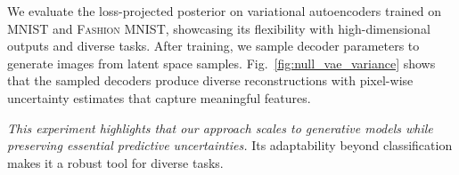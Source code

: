We evaluate the loss-projected posterior on variational autoencoders \citep{kingma2013auto} trained on \textsc{MNIST} and \textsc{Fashion MNIST}, showcasing its flexibility with high-dimensional outputs and diverse tasks. After training, we sample decoder parameters to generate images from latent space samples. Fig.~\ref{fig:null_vae_variance} shows that the sampled decoders produce diverse reconstructions with pixel-wise uncertainty estimates that capture meaningful features.

\emph{This experiment highlights that our approach scales to generative models while preserving essential predictive uncertainties.} Its adaptability beyond classification makes it a robust tool for diverse tasks.